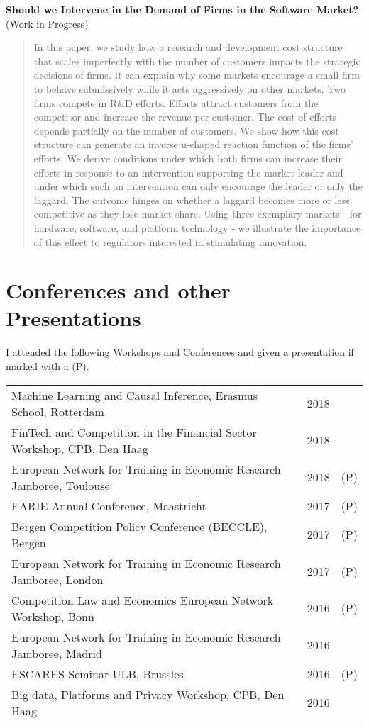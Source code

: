 \documentclass[a4paper,10pt]{article} %
\begin{document}
	\textbf{Should we Intervene in the Demand of Firms in the Software Market?}\\
	(Work in Progress)
	\begin{quotation}
		In this paper, we study how a research and development cost structure that scales imperfectly with the number of customers impacts the strategic decisions of firms. It can explain why some markets encourage a small firm to behave submissively while it acts aggressively on other markets. Two firms compete in R\&D efforts. Efforts attract customers from the competitor and increase the revenue per customer. The cost of efforts depends partially on the number of customers. We show how this cost structure can generate an inverse u-shaped reaction function of the firms' efforts. We derive conditions under which both firms can increase their efforts in response to an intervention supporting the market leader and under which such an intervention can only encourage the leader or only the laggard. The outcome hinges on whether a laggard becomes more or less competitive as they lose market share. Using three exemplary markets - for hardware, software, and platform technology - we illustrate the importance of this effect to regulators interested in stimulating innovation.
	\end{quotation}
		



\section{Conferences and other Presentations }

I attended the following Workshops and Conferences and given a presentation if marked with a (P).

\begin{tabular}{p{12cm}rr}
	Machine Learning and Causal Inference, Erasmus School, Rotterdam &2018&\\
	FinTech and Competition in the Financial Sector Workshop, CPB, Den Haag &2018&\\
	European Network for Training in Economic Research Jamboree, Toulouse&2018 & (P)\\
	EARIE Annual Conference, Maastricht &2017 &(P)\\
	Bergen Competition Policy Conference (BECCLE), Bergen&2017 &(P)\\
	European Network for Training in Economic Research Jamboree, London&2017 &(P)\\
	Competition Law and Economics European Network Workshop, Bonn&2016 &(P)\\
	European Network for Training in Economic Research Jamboree, Madrid &2016\\
	ESCARES Seminar ULB, Brussles& 2016 &(P)\\
	Big data, Platforms and Privacy Workshop, CPB, Den Haag &2016
\end{tabular}


\vfill
\end{document}
